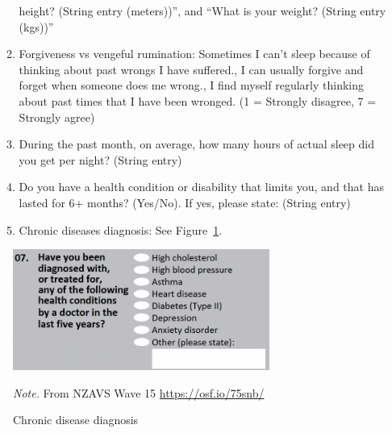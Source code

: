 \documentclass[
  man,
  longtable,
  nolmodern,
  notxfonts,
  notimes,
  colorlinks=true,linkcolor=blue,citecolor=blue,urlcolor=blue]{apa7}
\begin{document}
\begin{itemize}
\begin{enumerate}
    height? (String entry (meters))'', and ``What is your weight?
    (String entry (kgs))''
  \item
    Forgiveness vs vengeful rumination: Sometimes I can't sleep because
    of thinking about past wrongs I have suffered., I can usually
    forgive and forget when someone does me wrong., I find myself
    regularly thinking about past times that I have been wronged. (1 =
    Strongly disagree, 7 = Strongly agree)
  \item
    During the past month, on average, how many hours of actual sleep
    did you get per night? (String entry)
  \item
    Do you have a health condition or disability that limits you, and
    that has lasted for 6+ months? (Yes/No). If yes, please state:
    (String entry)
  \item
    Chronic diseases diagnosis: See Figure~\ref{fig-chrondis}.
  \end{enumerate}
\end{itemize}

\begin{figure}[!htbp]

{\caption{{Chronic disease diagnosis}{\label{fig-chrondis}}}}

\includegraphics[width=0.75\textwidth,height=\textheight]{figs/chronic-disease.png}

{\noindent \emph{Note.} From NZAVS Wave 15 \url{https://osf.io/75snb/}}

\end{figure}
\end{document}
